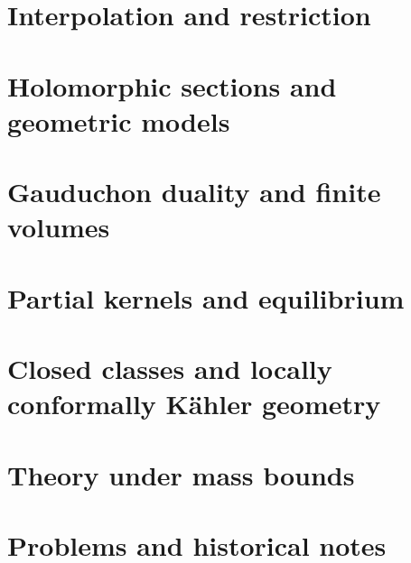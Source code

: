 \part{Interpolation and restriction}



\part{Holomorphic sections and geometric models}






\part{Gauduchon duality and finite volumes}

\part{Partial kernels and equilibrium}

\part{Closed classes and locally conformally K\"ahler geometry}

% 

\part{Theory under mass bounds}
\label{part:mass-bounds}




\part{Problems and historical notes}


\appendix


\backmatter


\cleardoublepage
\begingroup
\raggedcolumns
{}
\patchcmd{\endtheindex}{\end{multicols}}{\end{multicols*}}{}{}
\printindex
\endgroup

